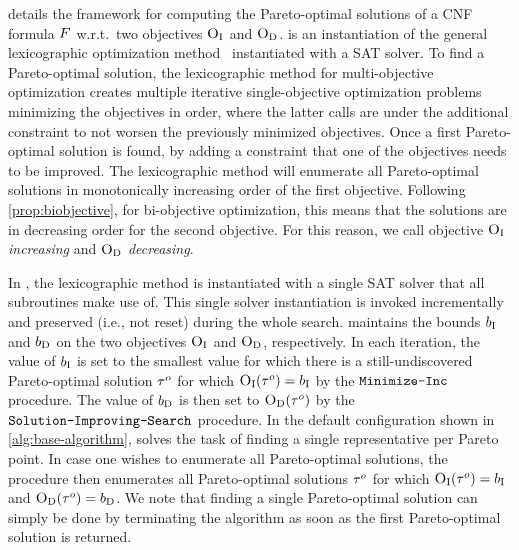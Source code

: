  details the \algname{} framework for computing the Pareto-optimal solutions of a CNF formula $F$ w.r.t.\ two objectives $\textsc{O}_{\text{I}}$ and $\textsc{O}_{\text{D}}$.
\algname{} is an instantiation of the general lexicographic optimization method~\autocite{survey} instantiated with a SAT solver.
To find a Pareto-optimal solution, the lexicographic method for multi-objective optimization creates multiple iterative single-objective optimization problems minimizing the objectives in order, where the latter calls are under the additional constraint to not worsen the previously minimized objectives.
Once a first Pareto-optimal solution is found, by adding a constraint that one of the objectives needs to be improved.
The lexicographic method will enumerate all Pareto-optimal solutions in monotonically increasing order of the first objective.
Following \cref{prop:biobjective}, for bi-objective optimization, this means that the solutions are in decreasing order for the second objective.
For this reason, we call objective $\textsc{O}_{\text{I}}$ \emph{increasing} and $\textsc{O}_{\text{D}}$ \emph{decreasing}.

In \algname{}, the lexicographic method is instantiated with a single SAT solver that all subroutines make use of.
This single solver instantiation is invoked incrementally and preserved (i.e., not reset) during the whole search. 
\algname{} maintains the bounds $b_{\text{I}}$ and $b_{\text{D}}$ on the two objectives $\textsc{O}_{\text{I}}$ and $\textsc{O}_{\text{D}}$, respectively.
In each iteration, the value of $b_{\text{I}}$ is set to the smallest value for which there is a still-undiscovered Pareto-optimal solution $\tau^o$ for which $\textsc{O}_{\text{I}}(\tau^o) = b_{\text{I}}$ by the $\texttt{Minimize-\allowbreak{}Inc}$ procedure.
The value of $b_{\text{D}}$ is then set to $\textsc{O}_{\text{D}}(\tau^o)$ by the $\texttt{Solution-\allowbreak{}Improving-\allowbreak{}Search}$ procedure.
In the default configuration shown in \cref{alg:base-algorithm}, \algname{} solves the task of finding a single representative per Pareto point.
In case one wishes to enumerate all Pareto-optimal solutions, the \E{} procedure then enumerates all Pareto-optimal solutions $\tau^o$ for which $\textsc{O}_{\text{I}}(\tau^o) = b_{\text{I}}$ and $\textsc{O}_{\text{D}}(\tau^o) = b_{\text{D}}$.
We note that finding a single Pareto-optimal solution can simply be done by terminating the algorithm as soon as the first Pareto-optimal solution is returned.

